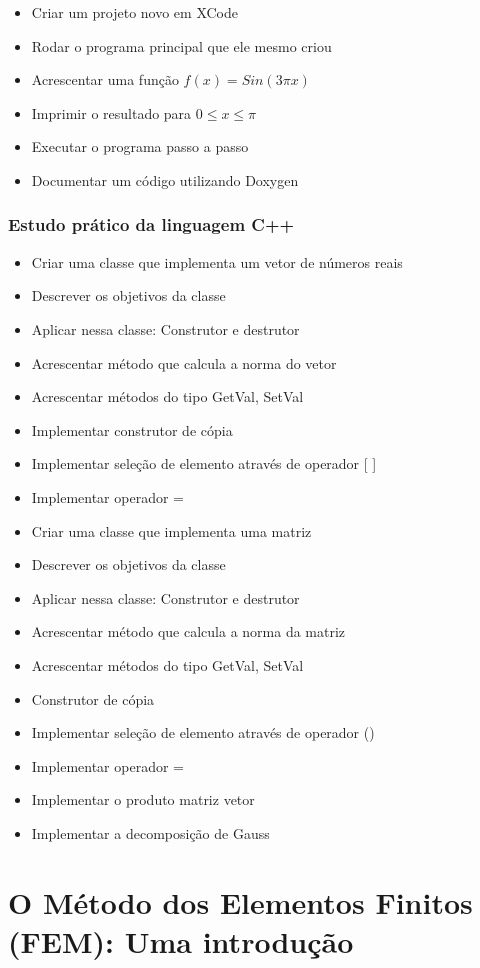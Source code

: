 \documentclass[11pt, oneside]{article}   	%
\begin{document}
\begin{itemize}
\item Criar um projeto novo em XCode 
\item Rodar o programa principal que ele mesmo criou 
\item Acrescentar uma função $f(x) = Sin(3\pi x) $
\item Imprimir o resultado para $0\leq x\leq \pi$ 
\item Executar o programa passo a passo
\item Documentar um código utilizando Doxygen 
\end{itemize}

\subsubsection{Estudo prático da linguagem C++}
\begin{itemize}
\item Criar uma classe que implementa um vetor de números reais 
\item Descrever os objetivos da classe 
\item Aplicar nessa classe: Construtor e destrutor 
\item Acrescentar método que calcula a norma do vetor 
\item Acrescentar métodos do tipo GetVal, SetVal 
\item Implementar construtor de cópia 
\item Implementar seleção de elemento através de operador [ ] 
\item Implementar operador = 
\item Criar uma classe que implementa uma matriz 
\item Descrever os objetivos da classe 
\item Aplicar nessa classe: Construtor e destrutor
\item Acrescentar método que calcula a norma da matriz 
\item Acrescentar métodos do tipo GetVal, SetVal 
\item Construtor de cópia 
\item Implementar seleção de elemento através de operador () 
\item Implementar operador = 
\item Implementar o produto matriz vetor 
\item Implementar a decomposição de Gauss 
\end{itemize}
\newpage
\section{O Método dos Elementos Finitos (FEM): Uma introdução}
\end{document}
